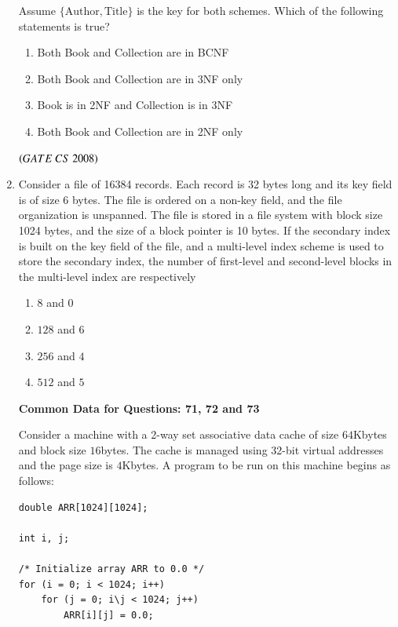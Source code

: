 \documentclass[journal, onecolumn]{IEEEtran}
\numberwithin{equation}{enumi}
\numberwithin{figure}{enumi}
\begin{document}
\begin{enumerate}
Assume $\{\text{Author}, \text{Title}\}$ is the key for both schemes. Which of the following statements is true?  

\begin{enumerate}
   \item Both Book and Collection are in BCNF  
   \item Both Book and Collection are in 3NF only  
   \item Book is in 2NF and Collection is in 3NF  
   \item Both Book and Collection are in 2NF only  
\end{enumerate}
\hfill $\left(GATE\ CS\  2008\right)$
\bigskip

\item Consider a file of 16384 records. Each record is 32 bytes long and its key field is of size 6 bytes. The file is ordered on a non-key field, and the file organization is
unspanned. The file is stored in a file system with block size 1024 bytes, and the size of a block pointer is 10 bytes. If the secondary index is built on the key field
of the file, and a multi-level index scheme is used to store the secondary index, the number of first-level and second-level blocks in the multi-level index are respectively
\vspace{-1em}%
\begin{multicols}{4}
\begin{enumerate}
    \item $8$ and $0$
    \item $128$ and $6$
    \item $256$ and $4$
    \item $512$ and $5$
\end{enumerate}
\end{multicols}
\begin{center}
\textbf{Common Data for Questions: 71, 72 and 73}  
\end{center}
Consider a machine with a 2-way set associative data cache of size $64$Kbytes and block size $16$bytes.
The cache is managed using 32-bit virtual addresses and the page size is $4$Kbytes.  
A program to be run on this machine begins as follows:  

\begin{verbatim}
double ARR[1024][1024];

int i, j;

/* Initialize array ARR to 0.0 */
for (i = 0; i < 1024; i++)
    for (j = 0; i\j < 1024; j++)
        ARR[i][j] = 0.0;
\end{verbatim}


\end{enumerate}
\end{document}
